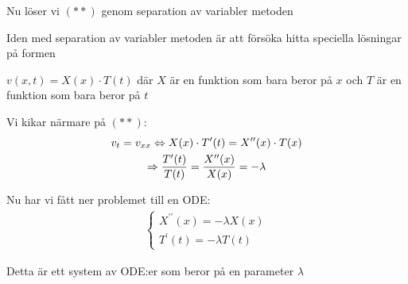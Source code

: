 \par\bigskip
\noindent Nu löser vi $(**)$ genom separation av variabler metoden
\par\bigskip
\noindent Iden med separation av variabler metoden är att försöka hitta speciella lösningar på formen\par\noindent $v(x,t) = X(x)\cdot T(t)$ där $X$ är en funktion som bara beror på $x$ och $T$ är en funktion som bara beror på $t$
\par\bigskip
\noindent Vi kikar närmare på $(**)$:
\begin{equation*}
  \begin{gathered}
    v_t = v_{xx}\Leftrightarrow X(x)\cdot T^{\prime}(t) = X^{\prime\prime}(x)\cdot T(x)\\
    \Rightarrow \dfrac{T^{\prime}(t)}{T(t)} = \dfrac{X^{\prime\prime}(x)}{X(x)} = -\lambda
  \end{gathered}
\end{equation*}
\par\bigskip
\noindent Nu har vi fått ner problemet till en ODE:
\begin{equation*}
  \begin{gathered}
    \begin{cases*}
      X^{\prime\prime}(x) = -\lambda X(x)\\
      T^{\prime}(t) = -\lambda T(t)
    \end{cases*}
  \end{gathered}
\end{equation*}\par
\noindent Detta är ett system av ODE:er som beror på en parameter $\lambda$

